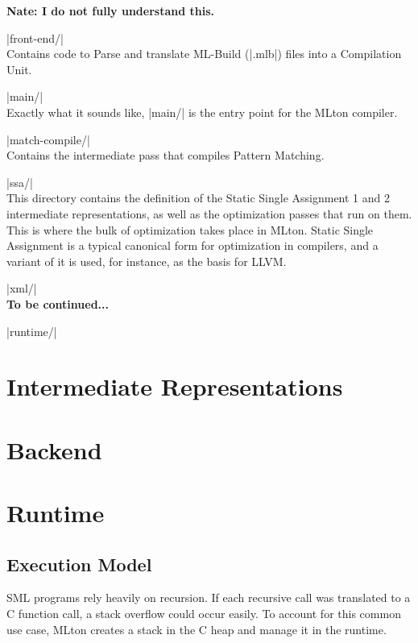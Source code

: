 \documentclass{article}
\begin{document}
\begin{description}
\begin{description}
  \textbf{Nate: I do not fully understand this.}
\item |front-end/| \\
  Contains code to Parse and translate ML-Build (|.mlb|) files into a Compilation Unit.
\item |main/| \\
  Exactly what it sounds like, |main/| is the entry point for the   MLton compiler.
\item |match-compile/| \\
  Contains the intermediate pass that compiles Pattern Matching.
\item |ssa/| \\
  This directory contains the definition of the Static Single Assignment 1 and 2 intermediate representations, as well as the optimization passes that run on them. This is where the bulk of optimization takes place in MLton. Static Single Assignment is a typical canonical form for optimization in compilers, and a variant of it is used, for instance, as the basis for LLVM.
\item |xml/| \\
  \textbf{To be continued...}
\end{description}

\item |runtime/| \\
  

\end{description}

\section{Intermediate Representations}

\section{Backend}

\section{Runtime}

\subsection{Execution Model}

SML programs rely heavily on recursion. If each recursive call was
translated to a C function call, a stack overflow could occur
easily. To account for this common use case, MLton creates a stack in
the C heap and manage it in the runtime.
\end{document}
